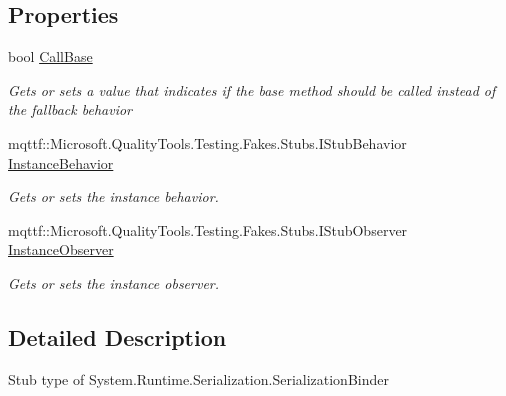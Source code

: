 \subsection*{Properties}
\begin{DoxyCompactItemize}
\item 
bool \hyperlink{class_system_1_1_runtime_1_1_serialization_1_1_fakes_1_1_stub_serialization_binder_a4ad5e667a1aca181283404c8a88c1fdd}{Call\-Base}
\begin{DoxyCompactList}\small\item\em Gets or sets a value that indicates if the base method should be called instead of the fallback behavior\end{DoxyCompactList}\item 
mqttf\-::\-Microsoft.\-Quality\-Tools.\-Testing.\-Fakes.\-Stubs.\-I\-Stub\-Behavior \hyperlink{class_system_1_1_runtime_1_1_serialization_1_1_fakes_1_1_stub_serialization_binder_adfad2153da5061272085e26a0e48c05f}{Instance\-Behavior}
\begin{DoxyCompactList}\small\item\em Gets or sets the instance behavior.\end{DoxyCompactList}\item 
mqttf\-::\-Microsoft.\-Quality\-Tools.\-Testing.\-Fakes.\-Stubs.\-I\-Stub\-Observer \hyperlink{class_system_1_1_runtime_1_1_serialization_1_1_fakes_1_1_stub_serialization_binder_a51f192ab2880c5bd086e9cf92ec4a695}{Instance\-Observer}
\begin{DoxyCompactList}\small\item\em Gets or sets the instance observer.\end{DoxyCompactList}\end{DoxyCompactItemize}


\subsection{Detailed Description}
Stub type of System.\-Runtime.\-Serialization.\-Serialization\-Binder



